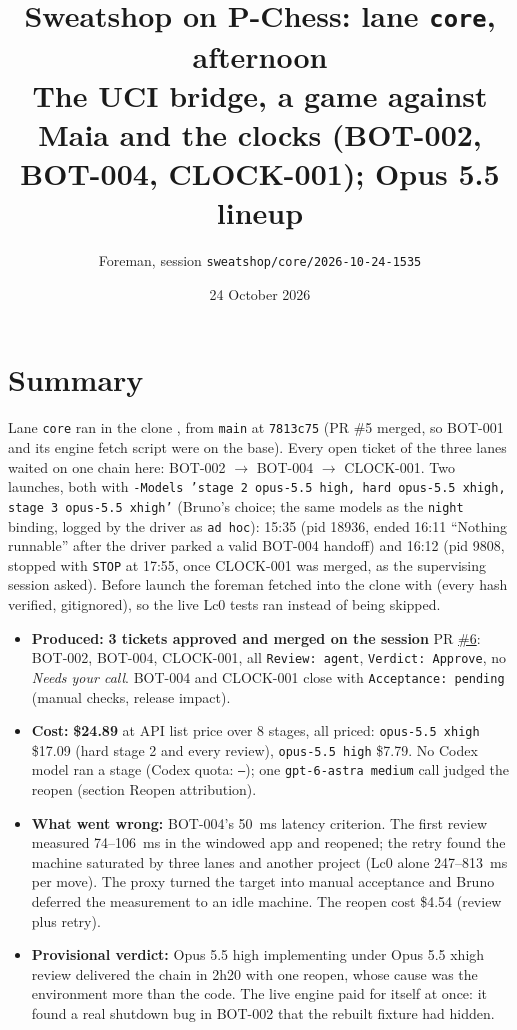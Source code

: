 \documentclass[11pt,a4paper]{article}
\title{Sweatshop on P-Chess: lane \texttt{core}, afternoon\\\large The UCI bridge, a game against Maia and the clocks (BOT-002, BOT-004, CLOCK-001); Opus 5.5 lineup}
\author{Foreman, session \texttt{sweatshop/core/2026-10-24-1535}}
\date{24 October 2026}
\begin{document}
\maketitle

\section*{Summary}

Lane \texttt{core} ran in the clone , from \texttt{main} at
\texttt{7813c75} (PR \#5 merged, so BOT-001 and its engine fetch script were on the base).
Every open ticket of the three lanes waited on one chain here: BOT-002 $\rightarrow$ BOT-004
$\rightarrow$ CLOCK-001. Two launches, both with \texttt{-Models 'stage 2 opus-5.5 high, hard
opus-5.5 xhigh, stage 3 opus-5.5 xhigh'} (Bruno's choice; the same models as the
\texttt{night} binding, logged by the driver as \texttt{ad hoc}): 15:35 (pid 18936, ended 16:11
``Nothing runnable'' after the driver parked a valid BOT-004 handoff) and 16:12 (pid 9808,
stopped with \texttt{STOP} at 17:55, once CLOCK-001 was merged, as the supervising session
asked). Before launch the foreman fetched  into the clone with
 (every hash verified, gitignored), so the live Lc0 tests ran
instead of being skipped.

\begin{itemize}
  \item \textbf{Produced:} \textbf{3 tickets approved and merged on the session} PR
        \href{https://github.com/Laginho/P-Chess/pull/6}{\#6}: BOT-002, BOT-004, CLOCK-001,
        all \texttt{Review: agent}, \texttt{Verdict: Approve}, no \emph{Needs your call}.
        BOT-004 and CLOCK-001 close with \texttt{Acceptance: pending} (manual checks, release
        impact).
  \item \textbf{Cost:} \textbf{\$24.89} at API list price over 8 stages, all priced:
        \texttt{opus-5.5 xhigh} \$17.09 (hard stage 2 and every review),
        \texttt{opus-5.5 high} \$7.79. No Codex model ran a stage (Codex quota: \texttt{--});
        one \texttt{gpt-6-astra medium} call judged the reopen (section Reopen attribution).
  \item \textbf{What went wrong:} BOT-004's 50~ms latency criterion. The first review
        measured 74--106~ms in the windowed app and reopened; the retry found the machine
        saturated by three lanes and another project (Lc0 alone 247--813~ms per move). The
        proxy turned the target into manual acceptance and Bruno deferred the measurement to
        an idle machine. The reopen cost \$4.54 (review plus retry).
  \item \textbf{Provisional verdict:} Opus 5.5 high implementing under Opus 5.5 xhigh review
        delivered the chain in 2h20 with one reopen, whose cause was the environment more
        than the code. The live engine paid for itself at once: it found a real shutdown bug
        in BOT-002 that the rebuilt fixture had hidden.
\end{itemize}
\end{document}
